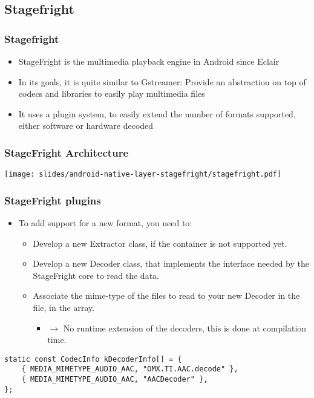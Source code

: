 \subsection{Stagefright}
\begin{frame}
  \frametitle{Stagefright}
  \begin{itemize}
  \item StageFright is the multimedia playback engine in Android since
    Eclair
  \item In its goals, it is quite similar to Gstreamer: Provide an
    abstraction on top of codecs and libraries to easily play
    multimedia files
  \item It uses a plugin system, to easily extend the number of
    formats supported, either software or hardware decoded
  \end{itemize}
\end{frame}

\begin{frame}
  \frametitle{StageFright Architecture}
  \begin{center}
    \texttt{[image: slides/android-native-layer-stagefright/stagefright.pdf]}
  \end{center}
\end{frame}

\begin{frame}[fragile]
  \frametitle{StageFright plugins}
  \begin{itemize}
  \item To add support for a new format, you need to:
    \begin{itemize}
    \item Develop a new Extractor class, if the container is not
      supported yet.
    \item Develop a new Decoder class, that implements the interface
      needed by the StageFright core to read the data.
    \item Associate the mime-type of the files to read to your new
      Decoder in the  file, in the
       array.
      \begin{itemize}
      \item $\rightarrow$ No runtime extension of the decoders, this
        is done at compilation time.
      \end{itemize}
    \end{itemize}
  \end{itemize}
\begin{verbatim}
static const CodecInfo kDecoderInfo[] = {
    { MEDIA_MIMETYPE_AUDIO_AAC, "OMX.TI.AAC.decode" },
    { MEDIA_MIMETYPE_AUDIO_AAC, "AACDecoder" },
};
\end{verbatim}
\end{frame}


